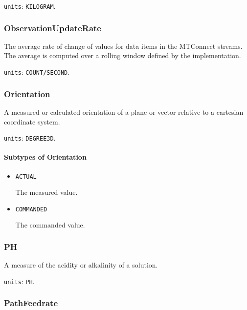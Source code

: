 \texttt{units}: \texttt{KILOGRAM}.


\subsubsection{ObservationUpdateRate}
\label{sec:ObservationUpdateRate}



The average rate of change of values for data items in the MTConnect streams. The average is computed over a rolling window defined by the implementation.


\texttt{units}: \texttt{COUNT/SECOND}.


\subsubsection{Orientation}
\label{sec:Orientation}



A measured or calculated orientation of a plane or vector relative to a cartesian coordinate system.


\texttt{units}: \texttt{DEGREE\textunderscore 3D}.

\paragraph{Subtypes of Orientation}\mbox{}
\label{sec:Subtypes of Orientation}

\begin{itemize}

\item \texttt{ACTUAL}


The measured value.

\item \texttt{COMMANDED}


The commanded value.


\end{itemize}





\subsubsection{PH}
\label{sec:PH}



A measure of the acidity or alkalinity of a solution.


\texttt{units}: \texttt{PH}.


\subsubsection{PathFeedrate}
\label{sec:PathFeedrate}



